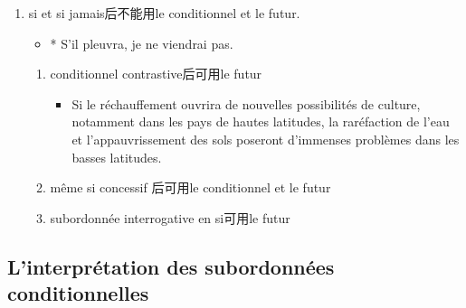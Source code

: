 \documentclass[UTF8]{report}
\begin{document}
\begin{enumerate}
    \item si et si jamais后不能用le conditionnel et le futur.
    \begin{itemize}
        \item * S’il pleuvra, je ne viendrai pas.
    \end{itemize}
    \begin{enumerate}
        \item conditionnel contrastive后可用le futur
        \begin{itemize}
            \item Si le réchauffement ouvrira de nouvelles possibilités de culture, notamment dans les pays de hautes latitudes, la raréfaction de l’eau et l’appauvrissement des sols poseront d’immenses problèmes dans les basses latitudes. 
        \end{itemize}
        \item même si concessif 后可用le conditionnel et le futur
        \item subordonnée interrogative en si可用le futur
    \end{enumerate}
\end{enumerate}




\subsection{L’interprétation des subordonnées conditionnelles}
\end{document}
